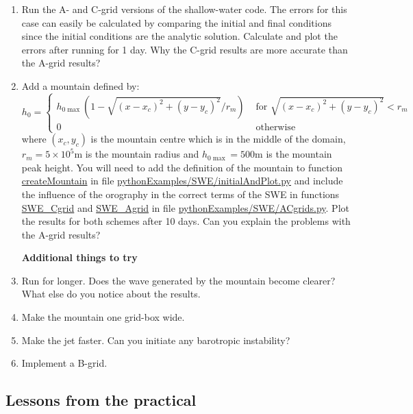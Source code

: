 \begin{enumerate}
\item Run the A- and C-grid versions of the shallow-water code. The errors for this case can easily be calculated by comparing the initial and final conditions since the initial conditions are the analytic solution. Calculate and plot the errors after running for 1 day. 
Why the C-grid results are more accurate than the A-grid results?
\item Add a mountain defined by:
\begin{equation*}
h_0 = \begin{cases}
h_{0\max}(1-\sqrt{(x-x_c)^2 + (y-y_c)^2}/r_m) &
\text{ for } \sqrt{(x-x_c)^2 + (y-y_c)^2} < r_m\\
0 & \text{ otherwise}
\end{cases}
\end{equation*}
where $(x_c,y_c)$ is the mountain centre which is in the middle of the domain, $r_m=5\times10^5\text{m}$ is the mountain radius and $h_{0\max}=500\text{m}$ is the mountain peak height. You will need to add the definition of the mountain to function \url{createMountain} in file \url{pythonExamples/SWE/initialAndPlot.py} and include the influence of the orography in the correct terms of the SWE in functions \url{SWE_Cgrid} and \url{SWE_Agrid} in file \url{pythonExamples/SWE/ACgrids.py}. Plot the results for both schemes after 10 days. Can you explain the problems with the A-grid results?

\clearpage
{\bf Additional things to try}

\item Run for longer. Does the wave generated by the mountain become clearer? What else do you notice about the results.

\item Make the mountain one grid-box wide.

\item Make the jet faster. Can you initiate any barotropic instability?

\item Implement a B-grid.

\end{enumerate}


\clearpage
\subsection{Lessons from the practical}
\clearpage

